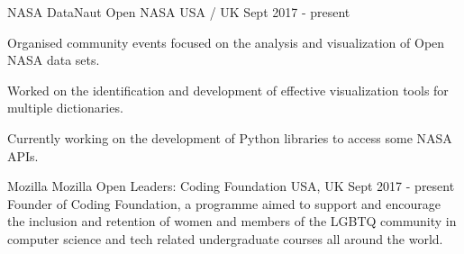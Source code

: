 


\begin{cventries}


\cventry
{NASA DataNaut} %
{Open NASA} %
{USA / UK} %
{Sept 2017 - present} %
{ %
\begin{cvitems}
\item {Organised community events focused on the analysis and visualization of Open NASA data sets.}
\item{Worked on the identification and development of effective visualization tools for multiple dictionaries.}
\item{Currently working on the development of Python libraries to access some NASA APIs.}
\end{cvitems}
}


\cventry
{Mozilla}
{Mozilla Open Leaders: Coding Foundation}
{USA, UK}
{Sept 2017 - present}
{
Founder of Coding Foundation, a programme aimed to support and encourage the inclusion and retention of women and members of the LGBTQ community in computer science and tech related undergraduate courses all around the world.
}


\end{cventries}
